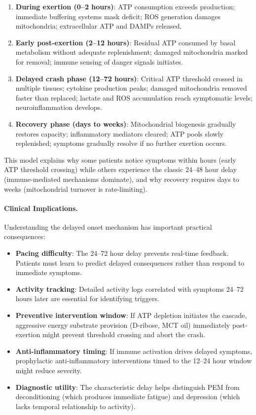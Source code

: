 \begin{enumerate}
    \item \textbf{During exertion (0--2 hours)}: ATP consumption exceeds production; immediate buffering systems mask deficit; ROS generation damages mitochondria; extracellular ATP and DAMPs released.
    \item \textbf{Early post-exertion (2--12 hours)}: Residual ATP consumed by basal metabolism without adequate replenishment; damaged mitochondria marked for removal; immune sensing of danger signals initiates.
    \item \textbf{Delayed crash phase (12--72 hours)}: Critical ATP threshold crossed in multiple tissues; cytokine production peaks; damaged mitochondria removed faster than replaced; lactate and ROS accumulation reach symptomatic levels; neuroinflammation develops.
    \item \textbf{Recovery phase (days to weeks)}: Mitochondrial biogenesis gradually restores capacity; inflammatory mediators cleared; ATP pools slowly replenished; symptoms gradually resolve if no further exertion occurs.
\end{enumerate}

This model explains why some patients notice symptoms within hours (early ATP threshold crossing) while others experience the classic 24--48 hour delay (immune-mediated mechanisms dominate), and why recovery requires days to weeks (mitochondrial turnover is rate-limiting).

\paragraph{Clinical Implications.}

Understanding the delayed onset mechanism has important practical consequences:

\begin{itemize}
    \item \textbf{Pacing difficulty}: The 24--72 hour delay prevents real-time feedback. Patients must learn to predict delayed consequences rather than respond to immediate symptoms.
    \item \textbf{Activity tracking}: Detailed activity logs correlated with symptoms 24--72 hours later are essential for identifying triggers.
    \item \textbf{Preventive intervention window}: If ATP depletion initiates the cascade, aggressive energy substrate provision (D-ribose, MCT oil) immediately post-exertion might prevent threshold crossing and abort the crash.
    \item \textbf{Anti-inflammatory timing}: If immune activation drives delayed symptoms, prophylactic anti-inflammatory interventions timed to the 12--24 hour window might reduce severity.
    \item \textbf{Diagnostic utility}: The characteristic delay helps distinguish PEM from deconditioning (which produces immediate fatigue) and depression (which lacks temporal relationship to activity).
\end{itemize}

